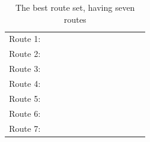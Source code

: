 \begin{table}[H]
    \centering
    \begin{tabular}{|l|l l l l l l l l|}
    \hline
    Route 1: & ~ & ~ & ~ & ~ & ~ & ~ & ~ & ~ \\
    Route 2: & ~ & ~ & ~ & ~ & ~ & ~ & ~ & ~ \\
    Route 3: & ~ & ~ & ~ & ~ & ~ & ~ & ~ & ~ \\
    Route 4: & ~ & ~ & ~ & ~ & ~ & ~ & ~ & ~ \\
    Route 5: & ~ & ~ & ~ & ~ & ~ & ~ & ~ & ~ \\
    Route 6: & ~ & ~ & ~ & ~ & ~ & ~ & ~ & ~ \\
    Route 7: & ~ & ~ & ~ & ~ & ~ & ~ & ~ & ~ \\
    \hline
    \end{tabular}
    \caption {The best route set, having seven routes}
    \label{table:performanceComparison_bestRouteSet7}
    \end{table}

